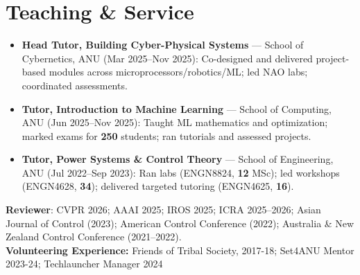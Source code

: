 

\section{Teaching \& Service}

\begin{itemize}[leftmargin=*,itemsep=0pt,parsep=0pt,topsep=0pt]
  \item \textbf{Head Tutor, Building Cyber-Physical Systems} --- School of Cybernetics, ANU (Mar 2025--Nov 2025): Co-designed and delivered project-based modules across microprocessors/robotics/ML; led NAO labs; coordinated assessments.
  \item \textbf{Tutor, Introduction to Machine Learning} --- School of Computing, ANU (Jun 2025--Nov 2025): Taught ML mathematics and optimization; marked exams for \textbf{250} students; ran tutorials and assessed projects.
  \item \textbf{Tutor, Power Systems \& Control Theory} --- School of Engineering, ANU (Jul 2022--Sep 2023): Ran labs (ENGN8824, \textbf{12} MSc); led workshops (ENGN4628, \textbf{34}); delivered targeted tutoring (ENGN4625, \textbf{16}).
\end{itemize}
\textbullet \textbf{Reviewer}: CVPR 2026; AAAI 2025; IROS 2025; ICRA 2025--2026; Asian Journal of Control (2023); American Control Conference (2022); Australia \& New Zealand Control Conference (2021--2022).\\
\textbullet \textbf{Volunteering Experience:} Friends of Tribal Society, 2017-18; Set4ANU Mentor 2023-24; Techlauncher Manager 2024